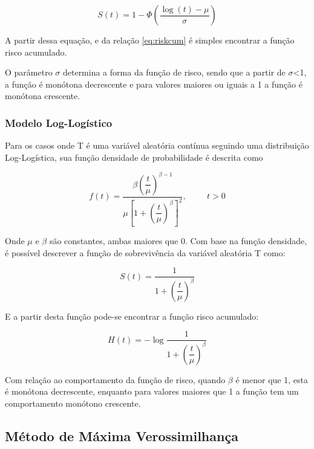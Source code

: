 \documentclass[a4paper,12pt]{article}
\begin{document}
\begin{equation} \label{eq:LNSurv}
 S(t) = 1 - \Phi\left(\dfrac{\log(t) - \mu}{\sigma}\right)
\end{equation}

A partir dessa equação, e da relação \ref{eq:riskcum} é simples encontrar a função risco acumulado.

O parâmetro $\sigma$ determina a forma da função de risco, sendo que a partir de $\sigma$<1, a função é monótona decrescente e para valores maiores ou iguais a 1 a função é monótona crescente.

\subsubsection{Modelo Log-Logístico}

Para os casos onde T é uma variável aleatória contínua seguindo uma distribuição Log-Logística, sua função densidade de probabilidade é descrita como

\begin{equation}
  f(t) = \dfrac{\beta\left(\dfrac{t}{\mu}\right)^{\beta - 1}}{\mu\left[1+\left(\dfrac{t}{\mu}\right)^{\beta}\right]^2}, \hspace{1cm} t > 0
\end{equation}

Onde $\mu$ e $\beta$ são constantes, ambas maiores que 0. Com base na função densidade, é possível descrever a função de sobrevivência da variável aleatória T como:

\begin{equation} \label{eq: LLSurv}
  S(t) = \dfrac{1}{1 + \left(\dfrac{t}{\mu}\right)^{\beta}}
\end{equation}

E a partir desta função pode-se encontrar a função risco acumulado:

\begin{equation} \label{eq: HazLL}
H(t) = - \log{\dfrac{1}{1 + \left(\dfrac{t}{\mu}\right)^{\beta}}}
\end{equation}

Com relação ao comportamento da função de risco, quando $\beta$ é menor que 1, esta é monótona decrescente, enquanto para valores maiores que 1 a função tem um comportamento monótono crescente.

\subsection{Método de Máxima Verossimilhança}
\end{document}
